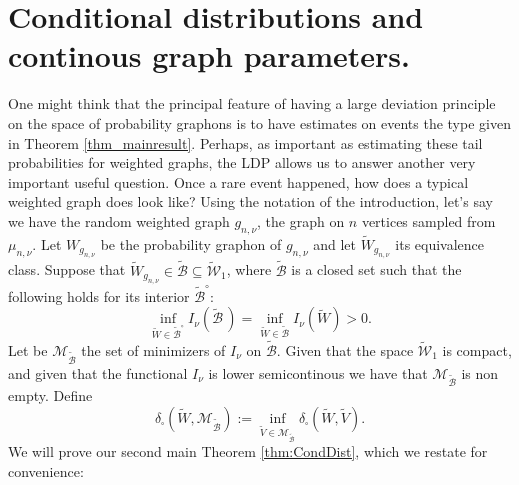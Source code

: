 \documentclass[12pt,twoside,a4paper]{article}
\begin{document}
\section{Conditional distributions and continous graph parameters.}\label{section:CondDist}
One might think that the principal feature of having a large deviation principle on the space of probability graphons is to have estimates on events the type given in Theorem \ref{thm_mainresult}. Perhaps, as important as estimating these tail probabilities for weighted graphs, the LDP allows us to answer another very important useful question. Once a rare event happened, how does a typical weighted graph does look like? Using the notation of the introduction, let's say we have the random weighted graph $g_{n,\nu}$, the graph  on $n$ vertices sampled from $\mu_{n,\nu}$. Let $W_{g_{n,\nu}}$ be the probability graphon of $g_{n,\nu}$ and let $\widetilde{W}_{g_{n,\nu}}$ its equivalence class. Suppose that $\widetilde{W}_{g_{n,\nu}}\in \widetilde{\mathcal{B}}\subseteq\widetilde{\mathcal{W}}_1$, where $\widetilde{\mathcal{B}}$ is a closed set such that the following holds for its interior $\widetilde{\mathcal{B}}^\circ$:
\begin{equation}\label{eq:closedsubset}
\inf_{\widetilde{W} \in \widetilde{\mathcal{B}}^\circ} I_\nu(\widetilde{\mathcal{B}}\,) = \inf_{\widetilde{W} \in \widetilde{\mathcal{B}}} I_\nu(\widetilde{W}) > 0.
\end{equation}
Let be $\mathscr{M}_{\widetilde{\mathcal{B}}}$ the set of minimizers of $I_\nu$ on $\widetilde{\mathcal{B}}$. Given that the space $\widetilde{\mathcal{W}}_1$ is compact, and given that the functional $I_\nu$ is lower semicontinous we have that $\mathscr{M}_{\widetilde{\mathcal{B}}}$ is non empty. Define
\begin{equation}\label{eq:cutmetricsets}
\delta_{\square}(\widetilde{W}, \mathscr{M}_{\widetilde{\mathcal{B}}}) := \inf_{\widetilde{V} \in \mathscr{M}_{\widetilde{\mathcal{B}}}} \delta_{\square}(\widetilde{W},\widetilde{V}). 
\end{equation}
We will prove our second main Theorem \ref{thm:CondDist}, which we restate for convenience: 

\SecondTheorem*
\end{document}
